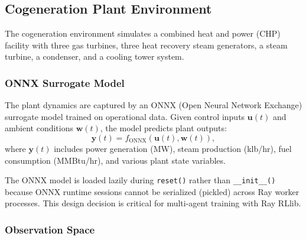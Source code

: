 \subsection{Cogeneration Plant Environment}
\label{sec:cogen_env}

The cogeneration environment simulates a combined heat and power (CHP) facility with three gas turbines, three heat recovery steam generators, a steam turbine, a condenser, and a cooling tower system.

\subsubsection{ONNX Surrogate Model}

The plant dynamics are captured by an ONNX (Open Neural Network Exchange) surrogate model trained on operational data. Given control inputs $\mathbf{u}(t)$ and ambient conditions $\mathbf{w}(t)$, the model predicts plant outputs:
\begin{equation}
    \mathbf{y}(t) = f_{\text{ONNX}}(\mathbf{u}(t), \mathbf{w}(t)),
    \label{eq:cogen_onnx}
\end{equation}
where $\mathbf{y}(t)$ includes power generation (MW), steam production (klb/hr), fuel consumption (MMBtu/hr), and various plant state variables.

\begin{remark}
The ONNX model is loaded lazily during \texttt{reset()} rather than \texttt{\_\_init\_\_()} because ONNX runtime sessions cannot be serialized (pickled) across Ray worker processes. This design decision is critical for multi-agent training with Ray RLlib.
\end{remark}

\subsubsection{Observation Space}

